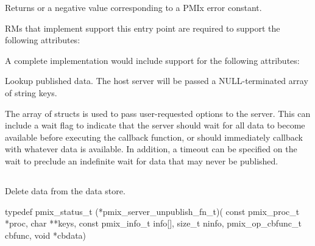 Returns  or a negative value corresponding to a PMIx error constant.

\reqattr
\acp{RM} that implement support this entry point are required to support the following attributes:


\optattr
A complete implementation would include support for the following attributes:


\descr

Lookup published data.
The host server will be passed a NULL-terminated array of string keys.

The array of  structs is used to pass user-requested options to the server.
This can include a wait flag to indicate that the server should wait for all data to become available before executing the callback function, or should immediately callback with whatever data is available.
In addition, a timeout can be specified on the wait to preclude an indefinite wait for data that may never be published.


\subsection{}

\summary

Delete data from the data store.

\format

\cspecificstart
\begin{codepar}
typedef pmix_status_t (*pmix_server_unpublish_fn_t)(
                             const pmix_proc_t *proc, char **keys,
                             const pmix_info_t info[], size_t ninfo,
                             pmix_op_cbfunc_t cbfunc, void *cbdata)
\end{codepar}
\cspecificend

\begin{arglist}
\end{arglist}

